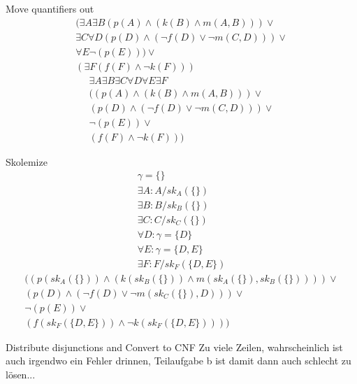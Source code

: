 \documentclass{article}
\begin{document}
Move quantifiers out
\begin{equation*}
\begin{aligned}
(\exists A \exists B ( p(A) \land ( k(B) \land m(A,B))) \lor \\
\exists C \forall D ( p(D) \land ( \lnot f(D) \lor \lnot m(C,D))) \lor \\
\forall E \lnot (p(E))) \lor \\
( \exists F (f(F) \land \lnot k(F)) )
\end{aligned}
\end{equation*}
\begin{equation*}
\begin{aligned}
\exists A \exists B \exists C \forall D \forall E \exists F \\
( ( p(A) \land ( k(B) \land m(A,B))) \lor \\
 ( p(D) \land ( \lnot f(D) \lor \lnot m(C,D))) \lor \\
 \lnot (p(E)) \lor \\
(f(F) \land \lnot k(F)) )
\end{aligned}
\end{equation*}

Skolemize
\begin{equation*}
\begin{aligned}
\gamma = \{\} \\
\exists A: A/sk_A(\{\}) \\
\exists B: B/sk_B(\{\}) \\
\exists C: C/sk_C(\{\}) \\
\forall D: \gamma = \{D\} \\
\forall E: \gamma = \{D,E\} \\
\exists F: F/sk_F(\{D,E\})
\end{aligned}
\end{equation*}
\begin{equation*}
\begin{aligned}
(( p(sk_A(\{\})) \land ( k(sk_B(\{\})) \land m(sk_A(\{\}),sk_B(\{\})))) \lor \\
( p(D) \land ( \lnot f(D) \lor \lnot m(sk_C(\{\}),D))) \lor \\
\lnot (p(E)) \lor \\
(f(sk_F(\{D,E\})) \land \lnot k(sk_F(\{D,E\}))) )
\end{aligned}
\end{equation*}

Distribute disjunctions and Convert to CNF
\newline
Zu viele Zeilen, wahrscheinlich ist auch irgendwo ein Fehler drinnen, Teilaufgabe b ist damit dann auch schlecht zu lösen...
\end{document}
